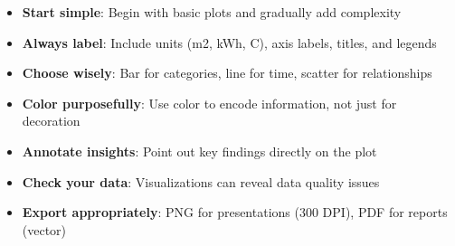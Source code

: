 

\begin{tcolorbox}[
    colframe=orange,
    colback=white,
    arc=2mm
]
\begin{itemize}
    \item \textbf{Start simple}: Begin with basic plots and gradually add complexity
    \item \textbf{Always label}: Include units (m2, kWh, C), axis labels, titles, and legends
    \item \textbf{Choose wisely}: Bar for categories, line for time, scatter for relationships
    \item \textbf{Color purposefully}: Use color to encode information, not just for decoration
    \item \textbf{Annotate insights}: Point out key findings directly on the plot
    \item \textbf{Check your data}: Visualizations can reveal data quality issues
    \item \textbf{Export appropriately}: PNG for presentations (300 DPI), PDF for reports (vector)
\end{itemize}
\end{tcolorbox}
